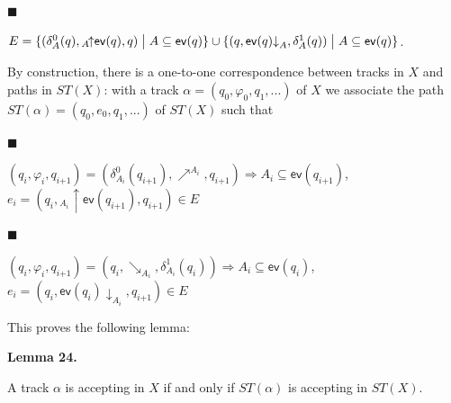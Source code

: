  
 
\par\noindent  $\blacksquare$ 
 
$E={\{(\delta_{A}^{0}(q),{}_{A\!}{\uparrow}{\mathsf{ev}(q)},q)\mathrel{\big{|}}A\subseteq\mathsf{ev}(q)\}}\cup{\{(q,{\mathsf{ev}(q)}{\downarrow}_{A},\delta_{A}^{1}(q))\mathrel{\big{|}}A\subseteq\mathsf{ev}(q)\}}$.\par
 
 
  
By construction, there is a one-to-one correspondence between tracks in $X$ and paths in $ST(X)$: with a track $\alpha=(q_{0},\varphi_{0},q_{1},...)$ of $X$ we associate the path $ST(\alpha)=(q_{0},e_{0},q_{1},...)$ of $ST(X)$ such that\par
  
\par\noindent  $\blacksquare$ 
 
$(q_{i},\varphi_{i},q_{i\text{+}1})=(\delta_{A_{i}}^{0}(q_{i\text{+}1}),\mathrel{\nearrow^{A_{i}}},q_{i\text{+}1})\Rightarrow A_{i}\subseteq\mathsf{ev}(q_{i\text{+}1})$, $e_{i}=(q_{i},{}_{A_{i}\!}{\uparrow}{\mathsf{ev}(q_{i\text{+}1})},q_{i\text{+}1})\in E$\par
 
 
 
\par\noindent  $\blacksquare$ 
 
$(q_{i},\varphi_{i},q_{i\text{+}1})=(q_{i},\mathrel{\searrow_{A_{i}}},\delta_{A_{i}}^{1}(q_{i}))\Rightarrow A_{i}\subseteq\mathsf{ev}(q_{i})$, $e_{i}=(q_{i},{\mathsf{ev}(q_{i})}{\downarrow}_{A_{i}},q_{i\text{+}1})\in E$\par
 
 
  
This proves the following lemma:\par
 
 
 
\par\medskip\noindent\textbf{Lemma 24.}\par
 
 
A track $\alpha$ is accepting in $X$ if and only if $ST(\alpha)$ is accepting in $ST(X)$.\par
 
 
